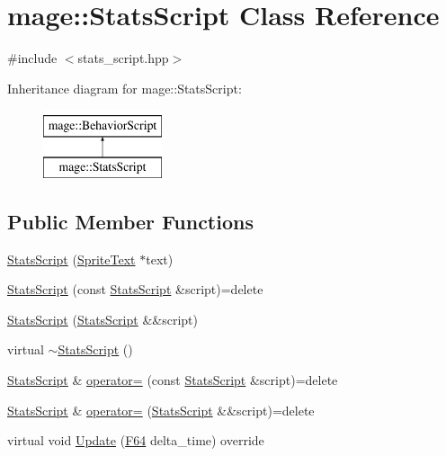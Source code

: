 \hypertarget{classmage_1_1_stats_script}{}\section{mage\+:\+:Stats\+Script Class Reference}
\label{classmage_1_1_stats_script}


{\ttfamily \#include $<$stats\+\_\+script.\+hpp$>$}

Inheritance diagram for mage\+:\+:Stats\+Script\+:\begin{figure}[H]
\begin{center}
\leavevmode
\includegraphics[height=2.000000cm]{classmage_1_1_stats_script}
\end{center}
\end{figure}
\subsection*{Public Member Functions}
\begin{DoxyCompactItemize}
\item 
\hyperlink{classmage_1_1_stats_script_a1deb5458611675fc99309edd01d285f8}{Stats\+Script} (\hyperlink{classmage_1_1_sprite_text}{Sprite\+Text} $\ast$text)
\item 
\hyperlink{classmage_1_1_stats_script_aab237b7c391d7ca7ad96cfa33a3aac81}{Stats\+Script} (const \hyperlink{classmage_1_1_stats_script}{Stats\+Script} \&script)=delete
\item 
\hyperlink{classmage_1_1_stats_script_af511d7e2e6bec30cd05782de94c65abe}{Stats\+Script} (\hyperlink{classmage_1_1_stats_script}{Stats\+Script} \&\&script)
\item 
virtual \hyperlink{classmage_1_1_stats_script_a65ba91e19c78c99831a65ad6dd6bb149}{$\sim$\+Stats\+Script} ()
\item 
\hyperlink{classmage_1_1_stats_script}{Stats\+Script} \& \hyperlink{classmage_1_1_stats_script_a7da39f1c0cc417dabdc539f49deec7c3}{operator=} (const \hyperlink{classmage_1_1_stats_script}{Stats\+Script} \&script)=delete
\item 
\hyperlink{classmage_1_1_stats_script}{Stats\+Script} \& \hyperlink{classmage_1_1_stats_script_a6adacd651debb83254e1121f32c8f21e}{operator=} (\hyperlink{classmage_1_1_stats_script}{Stats\+Script} \&\&script)=delete
\item 
virtual void \hyperlink{classmage_1_1_stats_script_ab25f82f68cfb2db9e13f210dcc0d5780}{Update} (\hyperlink{namespacemage_ad26233bbec640deda836e572c1a23708}{F64} delta\+\_\+time) override
\end{DoxyCompactItemize}
